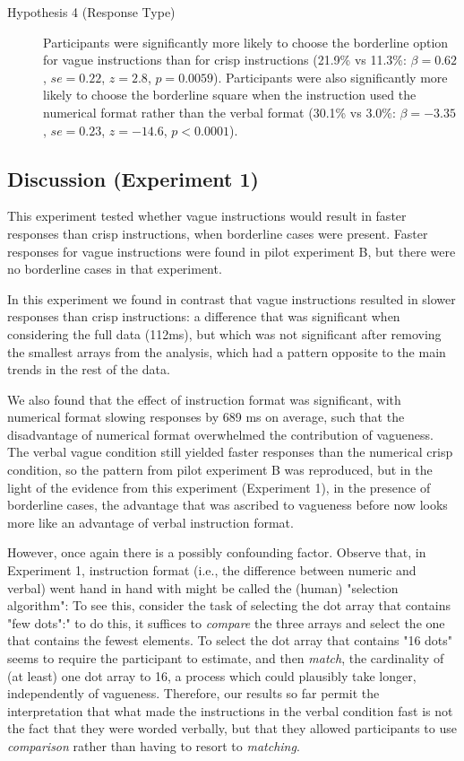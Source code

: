 \begin{description}
	\item [Hypothesis 4 (Response Type)] Participants were significantly more likely to choose the borderline option for vague instructions than for crisp instructions (21.9\% vs 11.3\%: $\beta=0.62$, $se=0.22$, $z=2.8$, $p=0.0059$). Participants were also significantly more likely to choose the borderline square when the instruction used the numerical format rather than the verbal format (30.1\% vs 3.0\%: $\beta=-3.35$, $se=0.23$, $z=-14.6$, $p<0.0001$). 
\end{description}

\subsection{Discussion (Experiment 1)}

This experiment tested whether vague instructions would result in faster responses than crisp instructions, when borderline cases were present. Faster responses for vague instructions were found in pilot experiment B, but there were no borderline cases in that experiment.

In this experiment we found in contrast that vague instructions resulted in slower responses than crisp instructions: a difference that was significant when considering the full data (112ms), but which was not significant after removing the smallest arrays from the analysis, which had a pattern opposite to the main trends in the rest of the data.

We also found that the effect of instruction format was significant, with numerical format slowing responses by 689 ms on average, such that the disadvantage of numerical format overwhelmed the contribution of vagueness. The verbal vague condition still yielded faster responses than the numerical crisp condition, so the pattern from pilot experiment B was reproduced, but in the light of the evidence from this experiment (Experiment 1), in the presence of borderline cases, the advantage that was ascribed to vagueness before now looks more like an advantage of verbal instruction format.

However, once again there is a possibly confounding factor. Observe that, in Experiment 1, instruction format (i.e., the difference between numeric and verbal) went hand in hand with might be called the (human) "selection algorithm": To see this, consider the task of selecting the dot array that contains "few dots":" to do this, it suffices to \emph{compare} the three arrays and select the one that contains the fewest elements.  To select the dot array that contains "16 dots" seems to require the participant to estimate, and then \emph{match}, the cardinality of (at least) one dot array to 16, a process which could plausibly take longer, independently of vagueness. Therefore, our results so far permit the interpretation that what made the instructions in the verbal condition fast is not the fact that they were worded verbally, but that they allowed participants to use \emph{comparison} rather than having to resort to \emph{matching}.

